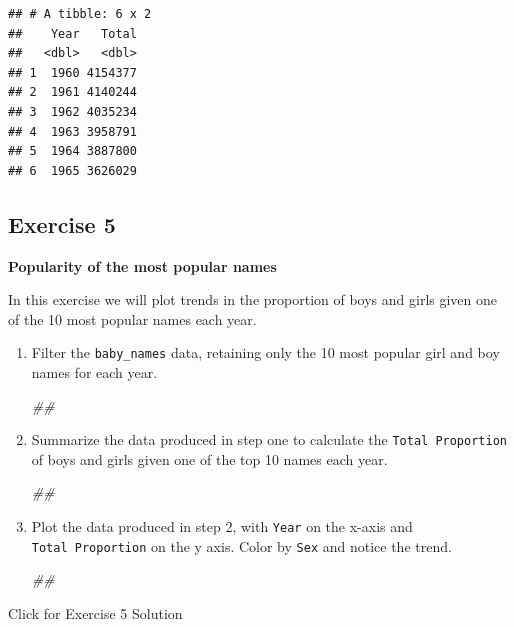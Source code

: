 \documentclass[
]{book}
\newenvironment{Shaded}{\begin{snugshade}}{\end{snugshade}}
\newcommand{\CommentTok}[1]{\textcolor[rgb]{0.56,0.35,0.01}{\textit{#1}}}
\begin{document}
\begin{verbatim}
## # A tibble: 6 x 2
##    Year   Total
##   <dbl>   <dbl>
## 1  1960 4154377
## 2  1961 4140244
## 3  1962 4035234
## 4  1963 3958791
## 5  1964 3887800
## 6  1965 3626029
\end{verbatim}

\hypertarget{exercise-5}{%
\subsection{Exercise 5}\label{exercise-5}}

\textbf{Popularity of the most popular names}

In this exercise we will plot trends in the proportion of boys and girls given one of the 10 most popular names each year.

\begin{enumerate}
\def\labelenumi{\arabic{enumi}.}
\item
  Filter the \texttt{baby\_names} data, retaining only the 10 most popular girl and boy names for each year.

\begin{Shaded}
\begin{Highlighting}[]
\CommentTok{\#\#}
\end{Highlighting}
\end{Shaded}
\item
  Summarize the data produced in step one to calculate the \texttt{Total\ Proportion} of boys and girls given one of the top 10 names each year.

\begin{Shaded}
\begin{Highlighting}[]
\CommentTok{\#\#}
\end{Highlighting}
\end{Shaded}
\item
  Plot the data produced in step 2, with \texttt{Year} on the x-axis and \texttt{Total\ Proportion} on the y axis. Color by \texttt{Sex} and notice the trend.

\begin{Shaded}
\begin{Highlighting}[]
\CommentTok{\#\#}
\end{Highlighting}
\end{Shaded}
\end{enumerate}

{Click for Exercise 5 Solution}
\end{document}
